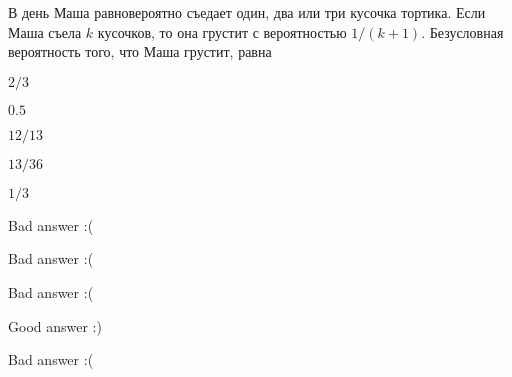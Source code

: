 
\begin{question}
В день Маша равновероятно съедает один, два или три кусочка тортика.
Если Маша съела \(k\) кусочков, то она грустит с вероятностью
\(1/(k+1)\). Безусловная вероятность того, что Маша грустит, равна
\begin{answerlist}
  \item \(2/3\)
  \item \(0.5\)
  \item \(12/13\)
  \item \(13/36\)
  \item \(1/3\)
\end{answerlist}
\end{question}

\begin{solution}
\begin{answerlist}
  \item Bad answer :(
  \item Bad answer :(
  \item Bad answer :(
  \item Good answer :)
  \item Bad answer :(
\end{answerlist}
\end{solution}

